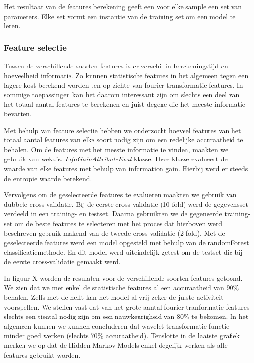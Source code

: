 \documentclass{article}
\begin{document}

Het resultaat van de features berekening geeft een voor elke sample een set van parameters. Elke set vormt een instantie van de training set om een model te leren.

\subsubsection{Feature selectie}
Tussen de verschillende soorten features is er verschil in berekeningstijd en hoeveelheid informatie. Zo kunnen statistische features in het algemeen tegen een lagere kost berekend worden ten op zichte van fourier transformatie features. In sommige toepassingen kan het daarom interessant zijn om slechts een deel van het totaal aantal features te berekenen en juist degene die het meeste informatie bevatten.

Met behulp van feature selectie hebben we onderzocht hoeveel features van het totaal aantal features van elke soort nodig zijn om een redelijke accuraatheid te behalen. Om de features met het meeste informatie te vinden, maakten we gebruik van weka's: \emph{InfoGainAttributeEval} klasse. %
 Deze klasse evalueert de waarde van elke features met behulp van information gain. Hierbij werd er steeds de entropie waarde berekend.

Vervolgens om de geselecteerde features te evalueren maakten we gebruik van dubbele cross-validatie. Bij de eerste cross-validatie (10-fold) werd de gegevensset verdeeld in een training- en testset. Daarna gebruikten we de gegeneerde training-set om de beste features te selecteren met het proces dat hierboven werd beschreven gebruik makend van de tweede cross-validatie (2-fold). Met de geselecteerde features werd een model opgesteld met behulp van de randomForest classificatiemethode. En dit model werd uiteindelijk getest om de testset die bij de eerste cross-validatie gemaakt werd.
	
In figuur X worden de resulaten voor de verschillende soorten features getoond. We zien dat we met enkel de statistische features al een accuraatheid van 90\% behalen. Zelfs met de helft kan het model al vrij zeker de juiste activiteit voorspellen. We stellen vast dat van het grote aantal fourier tranformatie features slechts een tiental nodig zijn om een nauwkeurigheid van 80\% te bekomen. In het algemeen kunnen we kunnen concluderen dat wavelet transformatie functie minder goed werken (slechts 70\% accuraatheid). Tenslotte in de laatste grafiek merken we op dat de Hidden Markov Models enkel degelijk werken als alle features gebruikt worden.
\end{document}

